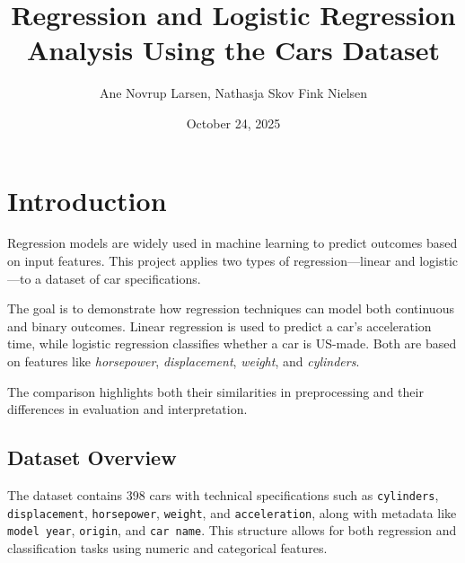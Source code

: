 \documentclass[a4paper, twocolumn]{article}
\author{Ane Novrup Larsen, Nathasja Skov Fink Nielsen}
\title{Regression and Logistic Regression Analysis Using the Cars Dataset}
\date{October 24, 2025}
\begin{document}

\section{Introduction\label{sec:Introduction}}
Regression models are widely used in machine learning to predict outcomes based on input features. This project applies two types of regression—linear and logistic—to a dataset of car specifications.

The goal is to demonstrate how regression techniques can model both continuous and binary outcomes. Linear regression is used to predict a car’s acceleration time, while logistic regression classifies whether a car is US-made. Both are based on features like \textit{horsepower}, \textit{displacement}, \textit{weight}, and \textit{cylinders}.

The comparison highlights both their similarities in preprocessing and their differences in evaluation and interpretation.

\subsection{Dataset Overview}
The dataset contains 398 cars with technical specifications such as \texttt{cylinders}, \texttt{displacement}, \texttt{horsepower}, \texttt{weight}, and \texttt{acceleration}, along with metadata like \texttt{model year}, \texttt{origin}, and \texttt{car name}. 
This structure allows for both regression and classification tasks using numeric and categorical features.
\end{document}
